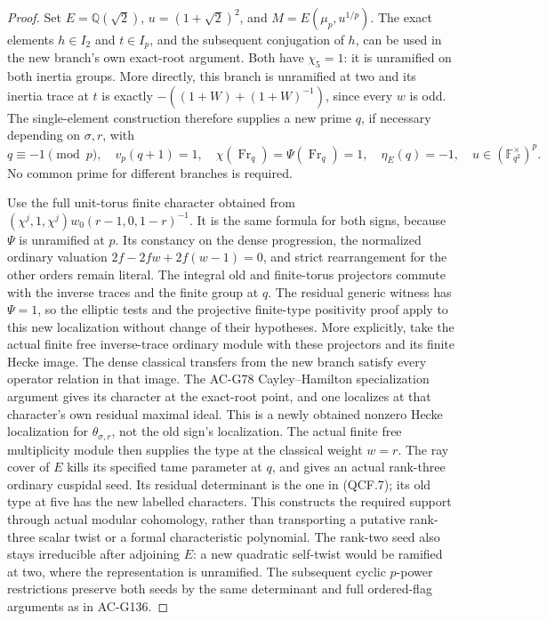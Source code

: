 \begin{proof}
Set \(E=\mathbb Q(\sqrt2)\), \(u=(1+\sqrt2)^2\), and
\(M=E(\mu_p,u^{1/p})\).  The exact elements \(h\in I_2\)
and \(t\in I_p\), and the subsequent conjugation of \(h\),
can be used in the new branch's own exact-root argument.
Both have \(\chi_5=1\): it is unramified on both inertia
groups.  More directly, this branch is unramified at two and
its inertia trace at \(t\) is exactly
\(-((1+W)+(1+W)^{-1})\), since every \(w\) is odd.
The single-element construction therefore supplies a new prime
\(q\), if necessary depending on \(\sigma,r\), with
\[
 q\equiv-1\pmod p,\quad v_p(q+1)=1,\quad
 \chi(\operatorname{Fr}_q)=\Psi(\operatorname{Fr}_q)=1,
 \quad\eta_E(q)=-1,
 \quad u\in(\mathbb F_{q^2}^{\times})^p.
 \tag{QCF.14}
\]
No common prime for different branches is required.

Use the full unit-torus finite character obtained from
\((\chi^j,1,\chi^j)w_0(r-1,0,1-r)^{-1}\).
It is the same formula for both signs, because \(\Psi\) is
unramified at \(p\).  Its constancy on the dense progression,
the normalized ordinary valuation \(2f-2fw+2f(w-1)=0\),
and strict rearrangement for the other orders remain literal.
The integral old and finite-torus projectors commute with the
inverse traces and the finite group at \(q\).  The residual
generic witness has \(\Psi=1\), so the elliptic tests and the
projective finite-type positivity proof apply to this new
localization without change of their hypotheses.
More explicitly, take the actual finite free inverse-trace ordinary
module with these projectors and its finite Hecke image.  The
dense classical transfers from the new branch satisfy every
operator relation in that image.  The AC-G78 Cayley--Hamilton
specialization argument gives its character at the exact-root
point, and one localizes at that character's own residual maximal
ideal.  This is a newly obtained nonzero Hecke localization for
\(\theta_{\sigma,r}\), not the old sign's localization.
The actual finite free multiplicity module then supplies the
type at the classical weight \(w=r\).  The ray cover of \(E\)
kills its specified tame parameter at \(q\), and gives an actual
rank-three ordinary cuspidal seed.  Its residual determinant is
the one in (QCF.7); its old type at five has the new labelled
characters.  This constructs the required support through
actual modular cohomology, rather than transporting a putative
rank-three scalar twist or a formal characteristic polynomial.
The rank-two seed also stays irreducible after adjoining \(E\):
a new quadratic self-twist would be ramified at two, where the
representation is unramified.  The subsequent cyclic
\(p\)-power restrictions preserve both seeds by the same
determinant and full ordered-flag arguments as in AC-G136.


\end{proof}

